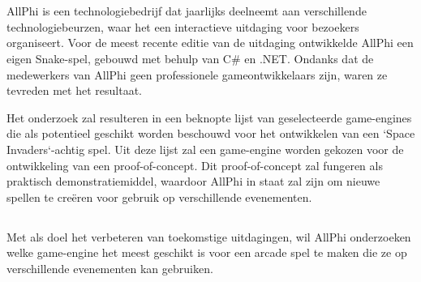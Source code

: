 
\chapter{}%
\label{ch:inleiding}



\section{}%
\label{sec:probleemstelling}

AllPhi is een technologiebedrijf dat jaarlijks deelneemt aan verschillende technologiebeurzen, waar het een interactieve uitdaging voor bezoekers organiseert. Voor de meest recente editie van de uitdaging ontwikkelde AllPhi een eigen Snake-spel, gebouwd met behulp van C\# en .NET. Ondanks dat de medewerkers van AllPhi geen professionele gameontwikkelaars zijn, waren ze tevreden met het resultaat.

Het onderzoek zal resulteren in een beknopte lijst van geselecteerde game-engines die als potentieel geschikt worden beschouwd voor het ontwikkelen van een `Space Invaders`-achtig spel. Uit deze lijst zal een game-engine worden gekozen voor de ontwikkeling van een proof-of-concept. Dit proof-of-concept zal fungeren als praktisch demonstratiemiddel, waardoor AllPhi in staat zal zijn om nieuwe spellen te creëren voor gebruik op verschillende evenementen.


\section{}%
\label{sec:onderzoeksvraag}

Met als doel het verbeteren van toekomstige uitdagingen, wil AllPhi onderzoeken welke game-engine het meest geschikt is voor een arcade spel te maken die ze op verschillende evenementen kan gebruiken.

\section{}%
\label{sec:onderzoeksdoelstelling}

